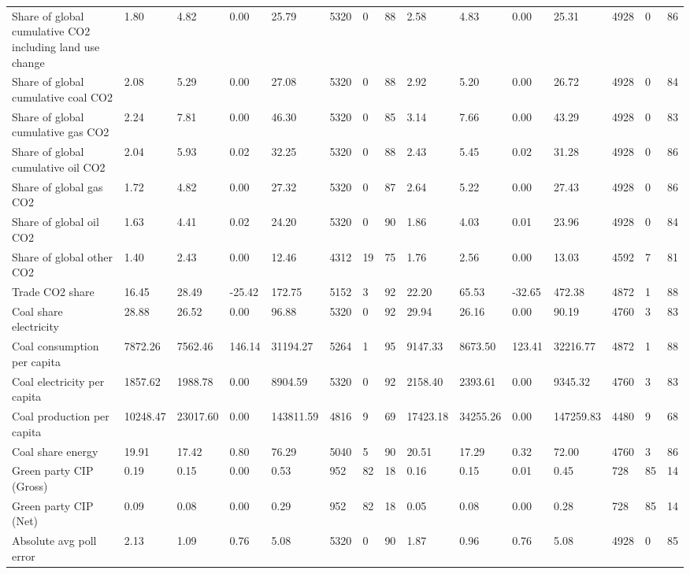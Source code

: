 \begin{longtable}{lllllllllllllll}
Share of global cumulative CO2 including land use change & 1.80 & 4.82 & 0.00 & 25.79 & 5320 & 0 & 88 & 2.58 & 4.83 & 0.00 & 25.31 & 4928 & 0 & 86\\
Share of global cumulative coal CO2 & 2.08 & 5.29 & 0.00 & 27.08 & 5320 & 0 & 88 & 2.92 & 5.20 & 0.00 & 26.72 & 4928 & 0 & 84\\
Share of global cumulative gas CO2 & 2.24 & 7.81 & 0.00 & 46.30 & 5320 & 0 & 85 & 3.14 & 7.66 & 0.00 & 43.29 & 4928 & 0 & 83\\
\addlinespace
Share of global cumulative oil CO2 & 2.04 & 5.93 & 0.02 & 32.25 & 5320 & 0 & 88 & 2.43 & 5.45 & 0.02 & 31.28 & 4928 & 0 & 86\\
Share of global gas CO2 & 1.72 & 4.82 & 0.00 & 27.32 & 5320 & 0 & 87 & 2.64 & 5.22 & 0.00 & 27.43 & 4928 & 0 & 86\\
Share of global oil CO2 & 1.63 & 4.41 & 0.02 & 24.20 & 5320 & 0 & 90 & 1.86 & 4.03 & 0.01 & 23.96 & 4928 & 0 & 84\\
Share of global other CO2 & 1.40 & 2.43 & 0.00 & 12.46 & 4312 & 19 & 75 & 1.76 & 2.56 & 0.00 & 13.03 & 4592 & 7 & 81\\
Trade CO2 share & 16.45 & 28.49 & -25.42 & 172.75 & 5152 & 3 & 92 & 22.20 & 65.53 & -32.65 & 472.38 & 4872 & 1 & 88\\
\addlinespace
Coal share electricity & 28.88 & 26.52 & 0.00 & 96.88 & 5320 & 0 & 92 & 29.94 & 26.16 & 0.00 & 90.19 & 4760 & 3 & 83\\
Coal consumption per capita & 7872.26 & 7562.46 & 146.14 & 31194.27 & 5264 & 1 & 95 & 9147.33 & 8673.50 & 123.41 & 32216.77 & 4872 & 1 & 88\\
Coal electricity per capita & 1857.62 & 1988.78 & 0.00 & 8904.59 & 5320 & 0 & 92 & 2158.40 & 2393.61 & 0.00 & 9345.32 & 4760 & 3 & 83\\
Coal production per capita & 10248.47 & 23017.60 & 0.00 & 143811.59 & 4816 & 9 & 69 & 17423.18 & 34255.26 & 0.00 & 147259.83 & 4480 & 9 & 68\\
Coal share energy & 19.91 & 17.42 & 0.80 & 76.29 & 5040 & 5 & 90 & 20.51 & 17.29 & 0.32 & 72.00 & 4760 & 3 & 86\\
\addlinespace
Green party CIP (Gross) & 0.19 & 0.15 & 0.00 & 0.53 & 952 & 82 & 18 & 0.16 & 0.15 & 0.01 & 0.45 & 728 & 85 & 14\\
Green party CIP (Net) & 0.09 & 0.08 & 0.00 & 0.29 & 952 & 82 & 18 & 0.05 & 0.08 & 0.00 & 0.28 & 728 & 85 & 14\\
Absolute avg poll error & 2.13 & 1.09 & 0.76 & 5.08 & 5320 & 0 & 90 & 1.87 & 0.96 & 0.76 & 5.08 & 4928 & 0 & 85\\

\end{longtable}
